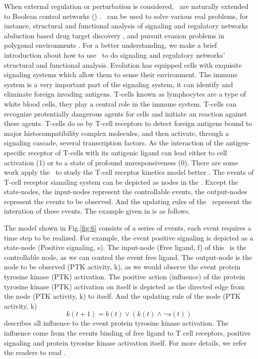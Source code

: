 When external regulation or perturbation is considered, \BNs\ are naturally extended to Boolean control networks (\BCNs) \cite{Ideker2001A}. \BCNs\ can be used to solve various real problems, for instance, %
structural and functional analysis of signaling and regulatory networks \cite{Kaufman1999A, Klamt2006A}
abduction based drug target discovery \cite{Biane2017Abduction}, %
and pursuit evasion problems in polygonal environments \cite{Thunberg2011A}. For a better understanding, we make a brief introduction about how to use \BCNs\ to do signaling and regulatory networks' structural and functional analysis. Evolution has equipped cells with exquisite signaling systems which allow them to sense their environment. The immune system is a very important part of the signaling system, it can identify and eliminate foreign invading antigens. T-cells known as lymphocytes are a type of white blood cells, they play a central role in the immune system. T-cells can recognize protentially dangerous agents for cells and initiate an reaction against these agents. T-cells do so by T-cell receptors to detect foreign antigens bound to major histocompatibility complex molecules, and then activate, through a signaling cascade, several transcription factors. As the interaction of the antigen-specific receptor of T-cells with its antigenic ligand can lead either to cell activation (1) or to a state of profound unresponsiveness (0). There are some work  apply the \BCNs\ to study the T-cell receptor kinetics model better \cite{Kaufman1999A, Klamt2006A}. The events of T-cell receptor sianaling system can be depicted as nodes in the \BCN. Except the state-nodes, the input-nodes represent the controllable events, the output-nodes represent the events to be observed. And the updating rules of the \BCN\ represent the interation of these events. The example given in \cite{Kaufman1999A} is as follows.
 \begin{example}The model shown in Fig.\ref{fig:6} consists of a series of events, each event requires a time step to be realized. For example, the event positive signaling is depicted as a state-node (Positive signaling, s). The input-node (Free ligand, f) of this \BCN\ is the controllable node, as we can control the event free ligand. The output-node is the node to be observed (PTK activity, k), as we would observe the event protein tyrosine kinase (PTK) activation. The positive action (influence) of the protein tyrosine kinase (PTK) activation on itself is depicted as the directed edge from the node (PTK activity, k) to itself. And the updating rule of the node (PTK activity, k)  
 \[k(t+1)=b(t)\vee (k(t)\wedge\neg s(t) )\] 
 describes all influence to the event protein tyrosine kinase activation. The influence come from the events binding of free ligand to T cell receptors, positive signaling and protein tyrosine kinase activation itself. For more details, we refer the readers to read \cite{Kaufman1999A, Klamt2006A}. 
\end{example}  


